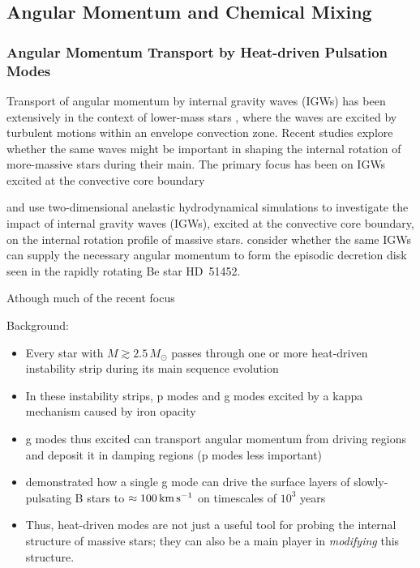
\subsection{Angular Momentum and Chemical Mixing}



{\color{brown}
\subsubsection{Angular Momentum Transport by Heat-driven Pulsation Modes}

Transport of angular momentum by internal gravity waves (IGWs) has been extensively in the context of lower-mass stars \citep[e.g.,][]{Schatzman:1993,Kumar:1997,Zahn:1997,Talon:2002,Talon:2005,Rogers:2008}, where the waves are excited by turbulent motions within an envelope convection zone. Recent studies explore whether the same waves might be important in shaping the internal rotation of more-massive stars during their main. The primary focus has been on IGWs excited at the convective core boundary

\citet{Rogers:2013aa} and
\citet{Rogers:2015aa} use two-dimensional anelastic hydrodynamical
simulations to investigate the impact of internal gravity waves
(IGWs), excited at the convective core boundary, on the internal
rotation profile of massive stars. \citet{Lee:2014aa} consider whether
the same IGWs can supply the necessary angular momentum to form the
episodic decretion disk seen in the rapidly rotating Be star HD~51452.


Athough much of the recent focus 

Background:
 \begin{itemize}
 \item Every star with $M \gtrsim 2.5\,M_{\odot}$ passes through one or more heat-driven instability strip during its main sequence evolution
 \item In these instability strips, p modes and g modes excited by a kappa mechanism caused by iron opacity
 \item g modes thus excited can transport angular momentum from driving regions and deposit it in damping regions (p modes less important)
 \item \citet{Townsend:2017aa} demonstrated how a single g mode can drive the surface layers of slowly-pulsating B stars to $\approx 100\,{\rm km\,s^{-1}}$ on timescales of $10^{3}$ years
 \item Thus, heat-driven modes are not just a useful tool for probing the internal structure of massive stars; they can also be a main player in \emph{modifying} this structure.
 \end{itemize}
 
}
